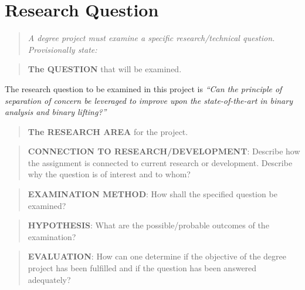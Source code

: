 \documentclass[12pt, a4paper]{article}
\begin{document}
\section{Research Question}

\begin{quote}
	\textit{A degree project must examine a specific research/technical question. Provisionally state:}
\end{quote}

\begin{quote}
	\textbf{The QUESTION} that will be examined.
\end{quote}


The research question to be examined in this project is \textit{``Can the principle of separation of concern be leveraged to improve upon the state-of-the-art in binary analysis and binary lifting?''}

\begin{quote}
	\textbf{The RESEARCH AREA} for the project.
\end{quote}


\begin{quote}
	\textbf{CONNECTION TO RESEARCH/DEVELOPMENT}: Describe how the assignment is connected to current research or development. Describe why the question is of interest and to whom?
\end{quote}


\begin{quote}
	\textbf{EXAMINATION METHOD}: How shall the specified question be examined?
\end{quote}


\begin{quote}
	\textbf{HYPOTHESIS}: What are the possible/probable outcomes of the examination?
\end{quote}


\begin{quote}
	\textbf{EVALUATION}: How can one determine if the objective of the degree project has been fulfilled and if the question has been answered adequately?
\end{quote}
\end{document}
